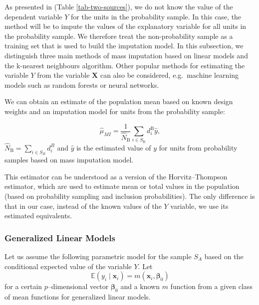 \documentclass[
]{jss}
\begin{document}
As presented in (Table \ref{tab-two-sources}), we do not know the value
of the dependent variable \(Y\) for the units in the probability sample.
In this case, the method will be to impute the values of the explanatory
variable for all units in the probability sample. We therefore treat the
non-probability sample as a training set that is used to build the
imputation model. In this subsection, we distinguish three main methods
of mass imputation based on linear models and the k-nearest neighbours
algorithm. Other popular methods for estimating the variable \(Y\) from
the variable \(\boldsymbol{X}\) can also be considered, e.g.~machine
learning models such as random forests or neural networks.

We can obtain an estimate of the population mean based on known design
weights and an imputation model for units from the probability sample:

\begin{equation}
\hat{\mu}_{M I}=\frac{1}{\hat{N}_{\mathrm{B}}} \sum_{i \in S_{\mathrm{B}}} d_i^{\mathrm{B}} \hat{y}, 
\end{equation} \(\hat{N}_{\mathrm{B}} = \sum_{i \in S_B} d_i^B\) and
\(\hat{y}\) is the estimated value of \(y\) for units from probability
samples based on mass imputation model.

This estimator can be understood as a version of the Horvitz--Thompson
estimator, which are used to estimate mean or total values in the
population (based on probability sampling and inclusion probabilities).
The only difference is that in our case, instead of the known values of
the \(Y\) variable, we use its estimated equivalents.

\subsubsection{Generalized Linear
Models}\label{generalized-linear-models}

Let us assume the following parametric model for the sample \(S_A\)
based on the conditional expected value of the variable \(Y\). Let
\begin{equation}
\mathbb{E}\left(y_i \mid \boldsymbol{x}_i\right)=m\left(\boldsymbol{x}_i, \boldsymbol{\beta}_0\right)
\end{equation} for a certain \(p\)--dimensional vector
\(\boldsymbol{\beta}_0\) and a known \(m\) function from a given class
of mean functions for generalized linear models.
\end{document}
